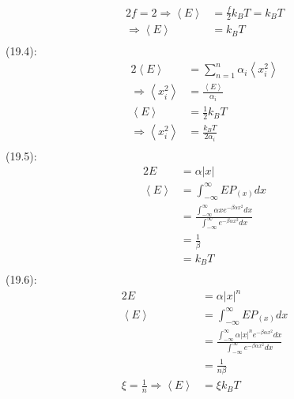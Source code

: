 \begin{latin}
\begin{latin}
\begin{alignat*}{2}
            f = 2 \Longrightarrow  \left \langle E \right \rangle &= \frac{f}{2} k_B T =k_B T\\
            \Longrightarrow \left \langle E \right \rangle &=k_B T\\
        \end{alignat*}
        (19.4):
        \begin{alignat*}{2}
            \left \langle E \right \rangle &= \sum_{n=1}^n \alpha_i \left \langle x_i ^2 \right \rangle\\
            \Longrightarrow\left \langle x_i ^2 \right \rangle &= \frac{\left \langle E \right \rangle}{\alpha_i}\\
            \left \langle E \right \rangle &= \frac{1}{2} k_B T\\
            \Longrightarrow \left \langle x_i ^2 \right \rangle &= \frac{k_B T}{2\alpha_i}\\
        \end{alignat*}
        (19.5):
        \begin{alignat*}{2}
            E &= \alpha |x|\\
            \left \langle E \right \rangle &= \int_{-\infty}^{\infty} E P_{(x)}dx \\
            &= \frac{\int_{-\infty}^{\infty} \alpha x e^{-\beta\alpha x^2}dx}{\int_{-\infty}^{\infty}  e^{-\beta\alpha x^2}dx}\\
            &= \frac{1}{\beta}\\
            &= k_B T \\       
        \end{alignat*}
        (19.6):
        \begin{alignat*}{2}
            E &= \alpha |x|^n\\
            \left \langle E \right \rangle &= \int_{-\infty}^{\infty} E P_{(x)}dx \\
            &= \frac{\int_{-\infty}^{\infty} \alpha |x|^n e^{-\beta\alpha x^2}dx}{\int_{-\infty}^{\infty}  e^{-\beta\alpha x^2}dx}\\
            &= \frac{1}{n\beta}\\
            \xi = \frac{1}{n} \Longrightarrow \left \langle E \right \rangle&=\xi k_B T \\ 
        \end{alignat*}

    \end{latin}
\end{latin}


